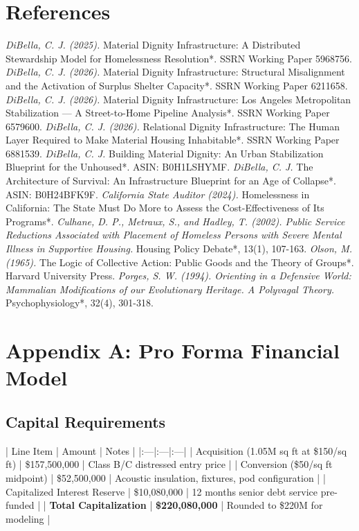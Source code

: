 \documentclass[12pt, letterpaper]{article}
\begin{document}
\newpage

\section*{References}

\textit{   DiBella, C. J. (2025). }Material Dignity Infrastructure: A Distributed Stewardship Model for Homelessness Resolution*. SSRN Working Paper 5968756.
\textit{   DiBella, C. J. (2026). }Material Dignity Infrastructure: Structural Misalignment and the Activation of Surplus Shelter Capacity*. SSRN Working Paper 6211658.
\textit{   DiBella, C. J. (2026). }Material Dignity Infrastructure: Los Angeles Metropolitan Stabilization --- A Street-to-Home Pipeline Analysis*. SSRN Working Paper 6579600.
\textit{   DiBella, C. J. (2026). }Relational Dignity Infrastructure: The Human Layer Required to Make Material Housing Inhabitable*. SSRN Working Paper 6881539.
\textit{   DiBella, C. J. }Building Material Dignity: An Urban Stabilization Blueprint for the Unhoused*. ASIN: B0H1LSHYMF.
\textit{   DiBella, C. J. }The Architecture of Survival: An Infrastructure Blueprint for an Age of Collapse*. ASIN: B0H24BFK9F.
\textit{   California State Auditor (2024). }Homelessness in California: The State Must Do More to Assess the Cost-Effectiveness of Its Programs*.
\textit{   Culhane, D. P., Metraux, S., and Hadley, T. (2002). Public Service Reductions Associated with Placement of Homeless Persons with Severe Mental Illness in Supportive Housing. }Housing Policy Debate*, 13(1), 107-163.
\textit{   Olson, M. (1965). }The Logic of Collective Action: Public Goods and the Theory of Groups*. Harvard University Press.
\textit{   Porges, S. W. (1994). Orienting in a Defensive World: Mammalian Modifications of our Evolutionary Heritage. A Polyvagal Theory. }Psychophysiology*, 32(4), 301-318.


\clearpage
\section{Appendix A: Pro Forma Financial Model}

\subsection{Capital Requirements}

| Line Item | Amount | Notes |
|:---|:---|:---|
| Acquisition (1.05M sq ft at \$150/sq ft) | \$157,500,000 | Class B/C distressed entry price |
| Conversion (\$50/sq ft midpoint) | \$52,500,000 | Acoustic insulation, fixtures, pod configuration |
| Capitalized Interest Reserve | \$10,080,000 | 12 months senior debt service pre-funded |
| \textbf{Total Capitalization} | \textbf{\$220,080,000} | Rounded to \$220M for modeling |
\end{document}
